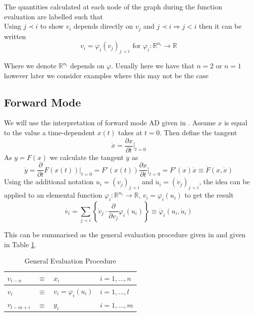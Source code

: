 \documentclass{article}
\begin{document}
The quantities calculated at each node of the graph during the function evaluation are labelled such that
\begin{equation*}
    [ \underbrace{v_{1-n}, \ldots, v_0}_{x} , v_1, \ldots, v_{l-m}, \underbrace{v_{l-m+1}, \ldots, v_l}_{y}]
\end{equation*}
Using $j \prec i$ to show $v_i$ depends directly on $v_j$ and $j \prec i \Longrightarrow j < i$ then it can be written
\begin{equation*}
    v_i = \varphi_i (v_j)_{j \prec i} \text{ for } \varphi_i : \mathbb{R}^{n_i} \longrightarrow \mathbb{R}
\end{equation*}

Where we denote $\mathbb{R}^{n_i}$ depends on $\varphi$. Usually here we have that $n=2$ or $n=1$ however later we consider examples where this may not be the case

\subsection{Forward Mode}

We will use the interpretation of forward mode AD given in \cite{dhamarticle}. Assume $x$ is equal to the value a time-dependent $x(t)$ takes at $t=0$. Then define the tangent 
\begin{equation*}
    \dot{x} = \frac{\partial x}{\partial t} \Big|_{t=0}
\end{equation*}
As $y = F(x)$ we calculate the tangent $\dot{y}$ as
\begin{equation*}
    \Dot{y} = \frac{\partial}{\partial t} F(x (t)) \Big|_{t=0} 
    = F'(x (t)) \frac{\partial x}{\partial t} \Big|_{t=0}
    = F'(x) \Dot{x}
    \equiv \Dot{F}(x, \Dot{x})
\end{equation*}
Using the additional notation $u_i = (v_j)_{j \prec i}$ and $\Dot{u}_i = (\Dot{v}_j)_{j \prec i}$, the idea can be applied to an elemental function $\varphi_i : \mathbb{R}^{n_i} \longrightarrow \mathbb{R}$, $v_i = \varphi_i (u_i)$ to get the result
\begin{equation} \label{tangentequ}
    \Dot{v_i} = \sum_{j \prec i} \left\{ \Dot{v}_j \cdot \frac{\partial}{\partial v_j} \varphi_i (u_i) \right\} 
    \equiv \Dot{\varphi}_i(u_i, \Dot{u}_i)
\end{equation}

This can be summarised as the general evaluation procedure given in \cite{evald} and given in Table \ref{tab:gep}.

\begin{table}[h]
    \centering
    \begin{tabular}{|lcll|}
        \hline
        $v_{i-n}$ & $\equiv$ & $x_i$ & $i = 1, \ldots, n$ \\
        \hline
        $v_{i}$ & $\equiv$ & $v_i = \varphi_i (u_i)$ & $i = 1, \ldots, l$ \\
        \hline
        $v_{l-m+i}$ & $\equiv$ & $y_i$ & $i = 1, \ldots, m$ \\
        \hline
    \end{tabular}
    \caption{General Evaluation Procedure}
    \label{tab:gep}
\end{table}
\end{document}
